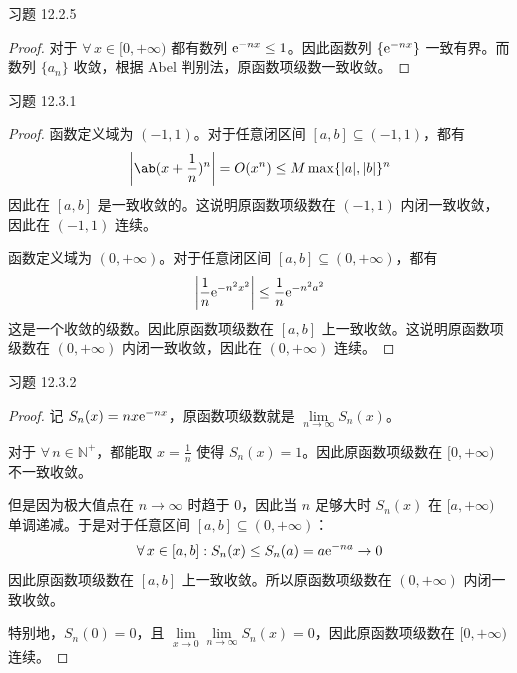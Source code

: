\begin{problem}
    习题 12.2.5
    \begin{proof}
        对于 $\forall\,x \in [0, + \infty)$ 都有数列 $\mathrm{e}^{-n x} \le 1$。因此函数列 $\{\mathrm{e}^{-n x}\}$ 一致有界。而数列 $\{a_n\}$ 收敛，根据 Abel 判别法，原函数项级数一致收敛。
    \end{proof}
\end{problem}

\begin{problem}
    习题 12.3.1
    \begin{proof}
        \item[\textbf{1)}] 函数定义域为 $(-1, 1)$。对于任意闭区间 $[a, b] \subseteq (-1, 1)$，都有
        $$
        \abs{\ab(x + \frac{1}{n})^{n}} = O(x^{n}) \le M \max\{|a|, |b|\}^{n}
        $$
        因此在 $[a, b]$ 是一致收敛的。这说明原函数项级数在 $(-1, 1)$ 内闭一致收敛，因此在 $(-1, 1)$ 连续。

        \item[\textbf{3)}] 函数定义域为 $(0, + \infty)$。对于任意闭区间 $[a, b] \subseteq (0, + \infty)$，都有
        $$
        \abs{\frac{1}{n} \mathrm{e}^{-n^2 x^2}} \le \frac{1}{n} \mathrm{e}^{- n^2 a^2}
        $$
        这是一个收敛的级数。因此原函数项级数在 $[a, b]$ 上一致收敛。这说明原函数项级数在 $(0, + \infty)$ 内闭一致收敛，因此在 $(0, + \infty)$ 连续。
    \end{proof}
\end{problem}

\begin{problem}
    习题 12.3.2
    \begin{proof}
        记 $S_n(x) = n x \mathrm{e}^{-n x}$，原函数项级数就是 $\lim\limits_{n \to \infty} S_n(x)$。

        对于 $\forall\,n \in \mathbb{N}^{+}$，都能取 $x = \frac{1}{n}$ 使得 $S_n(x) = 1$。因此原函数项级数在 $[0, + \infty)$ 不一致收敛。

        但是因为极大值点在 $n \to \infty$ 时趋于 $0$，因此当 $n$ 足够大时 $S_n(x)$ 在 $[a, + \infty)$ 单调递减。于是对于任意区间 $[a, b] \subseteq (0, + \infty)$：
        $$
        \forall\,x \in [a, b]: S_n(x) \le S_n(a) = a \mathrm{e}^{-n a} \to 0
        $$
        因此原函数项级数在 $[a, b]$ 上一致收敛。所以原函数项级数在 $(0, + \infty)$ 内闭一致收敛。
        
        特别地，$S_n(0) = 0$，且 $\lim\limits_{x \to 0} \lim\limits_{n \to \infty} S_n(x) = 0$，因此原函数项级数在 $[0, + \infty)$ 连续。
    \end{proof}
\end{problem}

